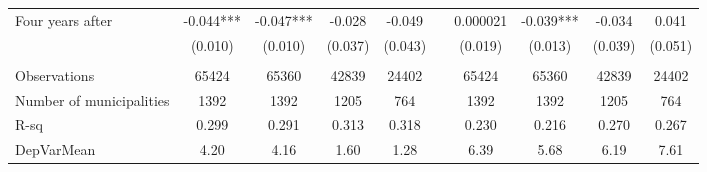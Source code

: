 \begin{tabular}{lccccccccc}
Four years after & -0.044*** & -0.047*** & -0.028 & -0.049 &       & 0.000021 & -0.039*** & -0.034 & 0.041 \\
      & (0.010) & (0.010) & (0.037) & (0.043) &       & (0.019) & (0.013) & (0.039) & (0.051) \\
      &       &       &       &       &       &       &       &       &  \\
\midrule
Observations & 65424 & 65360 & 42839 & 24402 &       & 65424 & 65360 & 42839 & 24402 \\
Number of municipalities & 1392  & 1392  & 1205  & 764   &       & 1392  & 1392  & 1205  & 764 \\
R-sq  & 0.299 & 0.291 & 0.313 & 0.318 &       & 0.230 & 0.216 & 0.270 & 0.267 \\
DepVarMean & 4.20  & 4.16  & 1.60  & 1.28  &       & 6.39  & 5.68  & 6.19  & 7.61 \\
\bottomrule
\bottomrule
\end{tabular}%
